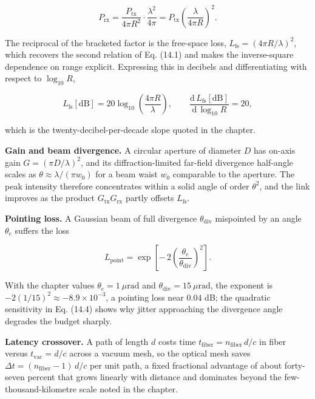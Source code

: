 \documentclass[
  11pt,
  openany,
  oneside]{book}
\begin{document}
\begin{equation}
P_{\mathrm{rx}} = \frac{P_{\mathrm{tx}}}{4\pi R^2}\cdot\frac{\lambda^2}{4\pi} = P_{\mathrm{tx}}\left(\frac{\lambda}{4\pi R}\right)^2. \tag{14.2}
\end{equation}

The reciprocal of the bracketed factor is the free-space loss,
\(L_{\mathrm{fs}} = (4\pi R/\lambda)^2\), which recovers the second
relation of Eq. (14.1) and makes the inverse-square dependence on range
explicit. Expressing this in decibels and differentiating with respect
to \(\log_{10} R\),

\begin{equation}
L_{\mathrm{fs}}[\mathrm{dB}] = 20\log_{10}\!\left(\frac{4\pi R}{\lambda}\right), \qquad \frac{\mathrm{d}\,L_{\mathrm{fs}}[\mathrm{dB}]}{\mathrm{d}\,\log_{10} R} = 20, \tag{14.3}
\end{equation}

which is the twenty-decibel-per-decade slope quoted in the chapter.

\textbf{Gain and beam divergence.} A circular aperture of diameter \(D\)
has on-axis gain \(G = (\pi D/\lambda)^2\), and its diffraction-limited
far-field divergence half-angle scales as
\(\theta \approx \lambda/(\pi w_0)\) for a beam waist \(w_0\) comparable
to the aperture. The peak intensity therefore concentrates within a
solid angle of order \(\theta^2\), and the link improves as the product
\(G_{\mathrm{tx}}G_{\mathrm{rx}}\) partly offsets \(L_{\mathrm{fs}}\).

\textbf{Pointing loss.} A Gaussian beam of full divergence
\(\theta_{\mathrm{div}}\) mispointed by an angle \(\theta_e\) suffers
the loss

\begin{equation}
L_{\mathrm{point}} = \exp\!\left[-\,2\left(\frac{\theta_e}{\theta_{\mathrm{div}}}\right)^2\right]. \tag{14.4}
\end{equation}

With the chapter values \(\theta_e = 1\ \mu\mathrm{rad}\) and
\(\theta_{\mathrm{div}} = 15\ \mu\mathrm{rad}\), the exponent is
\(-2(1/15)^2 \approx -8.9\times10^{-3}\), a pointing loss near \(0.04\)
dB; the quadratic sensitivity in Eq. (14.4) shows why jitter approaching
the divergence angle degrades the budget sharply.

\textbf{Latency crossover.} A path of length \(d\) costs time
\(t_{\mathrm{fiber}} = n_{\mathrm{fiber}}\,d/c\) in fiber versus
\(t_{\mathrm{vac}} = d/c\) across a vacuum mesh, so the optical mesh
saves \(\Delta t = (n_{\mathrm{fiber}}-1)\,d/c\) per unit path, a fixed
fractional advantage of about forty-seven percent that grows linearly
with distance and dominates beyond the few-thousand-kilometre scale
noted in the chapter.
\end{document}
